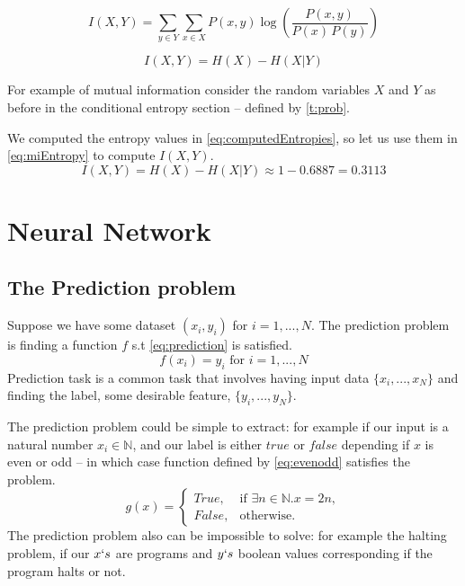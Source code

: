 \documentclass[dissertation.tex]{subfiles}
\begin{document}
\begin{equation}
      I(X,Y)=\sum _{y\in Y}\sum _{x\in X}{P(x,y)\log {\left({\frac
      {P(x,y)}{P(x)\,P(y)}}\right)}} 
\label{eq:miExplicit}
\end{equation}

\begin{equation}
  I(X, Y) = H(X) - H(X|Y)
\label{eq:miEntropy}
\end{equation}

For example of mutual information consider the random variables $X$ and $Y$ as
before in the conditional entropy section -- defined by \autoref{t:prob}. 

We computed the entropy values in \autoref{eq:computedEntropies}, so let us use
them in \autoref{eq:miEntropy} to compute $I(X,Y)$.
\begin{equation}
  I(X,Y) = H(X) - H(X|Y) \approx 1 - 0.6887 = 0.3113
\end{equation}

\section{Neural Network}
\label{sec:NN}

\subsection{The Prediction problem} 

Suppose we have some dataset $(x_i, y_i)$ for $i = 1,...,N$. The prediction
problem is finding a function $f$ s.t \autoref{eq:prediction} is satisfied.
\begin{equation}
  f(x_i) = y_i \text{ for } i = 1,...,N
  \label{eq:prediction}
\end{equation}
Prediction task is a common task that involves having input data
$\{x_i,...,x_N\}$ and finding the label, some desirable feature,
$\{y_i,...,y_N\}$. 

The prediction problem could be simple to extract: for example if our input is a
natural number $x_i\in\mathbb{N}$, and our label is either $true$ or $false$
depending if $x$ is even or odd -- in which case function defined by
\autoref{eq:evenodd} satisfies the problem.  \begin{equation}
  g(x) = \begin{cases}
    True, & \text{if } \exists n\in\mathbb{N}.x = 2n , \\
    False, & \text{otherwise}.
  \end{cases}
\label{eq:evenodd}
\end{equation}
The prediction problem also can be impossible to solve: for example the halting
problem, if our $x`s$ are programs and $y`s$ boolean values corresponding if the
program halts or not.
\end{document}
